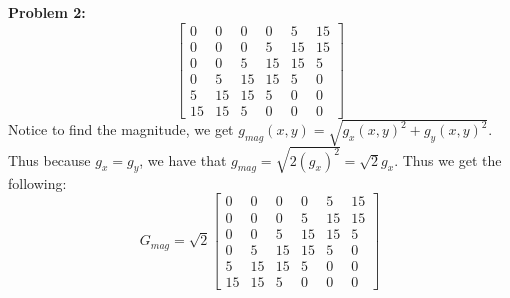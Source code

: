 \documentclass[11pt]{article}
\newenvironment{problem}[1]{\textbf{Problem #1: }}{\newpage}
\begin{document}
\begin{problem}{2}
\[\begin{bmatrix}
			0 & 0 & 0 & 0 & 5 & 15 \\
			0 & 0 & 0 & 5 & 15 & 15 \\
			0 & 0 & 5 & 15 & 15 & 5 \\
			0 & 5 & 15 & 15 & 5 & 0 \\
			5 & 15 & 15 & 5 & 0 & 0 \\
			15 & 15 & 5 & 0 & 0 & 0
		\end{bmatrix} \]
		Notice to find the magnitude, we get $g_{mag}(x,y) = \sqrt{g_x(x,y)^2 + g_y(x,y)^2}$.  Thus because $g_x = g_y$, we have that $g_{mag} = \sqrt{2 (g_x)^2} = \sqrt{2}g_x$.  Thus we get the following:
		\[G_{mag} = \sqrt{2}\begin{bmatrix}
			0 & 0 & 0 & 0 & 5 & 15 \\
			0 & 0 & 0 & 5 & 15 & 15 \\
			0 & 0 & 5 & 15 & 15 & 5 \\
			0 & 5 & 15 & 15 & 5 & 0 \\
			5 & 15 & 15 & 5 & 0 & 0 \\
			15 & 15 & 5 & 0 & 0 & 0
		\end{bmatrix}\]
	\end{problem}
\end{document}
